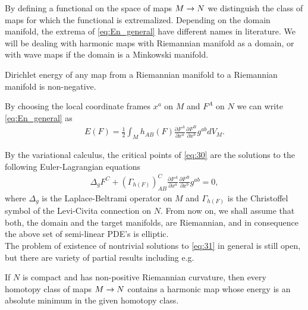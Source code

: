 By defining a functional on the space of maps $M\rightarrow N$ we distinguish
the class of maps for which the functional is extremalized. Depending
on the domain manifold, the extrema of \eqref{eq:En_general} have
different names in literature. We will be dealing with harmonic maps
with Riemannian manifold as a domain, or with wave maps if the domain
is a Minkowski manifold.

\begin{remark}
  Dirichlet energy of any map from a Riemannian manifold to a
  Riemannian manifold is non-negative.
\end{remark}

By choosing the local coordinate frames
$x^a$ on $M$ and $F^A$ on $N$ we can write \eqref{eq:En_general} as
\begin{align}
  \label{eq:30}
  E(F)=\frac{1}{2}\int_M h_{AB}(F)\frac{\partial F^A}{\partial
    x^a}\frac{\partial F^B}{\partial x^b}g^{ab}dV_M.
\end{align}

By the variational calculus, the critical points of \eqref{eq:30} are
the solutions to the following Euler-Lagrangian equations
\begin{align}
  \label{eq:31}
  \Delta_g F^C+(\Gamma_{h(F)})_{AB}^{C}\frac{\partial F^A}{\partial
    x^a}\frac{\partial F^B}{\partial x^b}g^{ab}=0,
\end{align}
where $\Delta_g$ is the Laplace-Beltrami operator on $M$ and
$\Gamma_{h(F)}$ is the Christoffel symbol of the Levi-Civita
connection on $N$. From now on, we shall assume that both, the domain
and the target manifolds, are Riemannian, and in consequence the above
set of semi-linear PDE's is elliptic.\\

The problem of existence of nontrivial solutions to \eqref{eq:31} in
general is still open, but there are variety of partial results
including e.g.

\begin{theorem}\label{thm:Eells-Sampson}
  If $N$ is compact and has non-positive Riemannian curvature, then
  every homotopy class of maps $M\rightarrow N$ contains a harmonic map whose
  energy is an absolute minimum in the given homotopy class.
\end{theorem}

